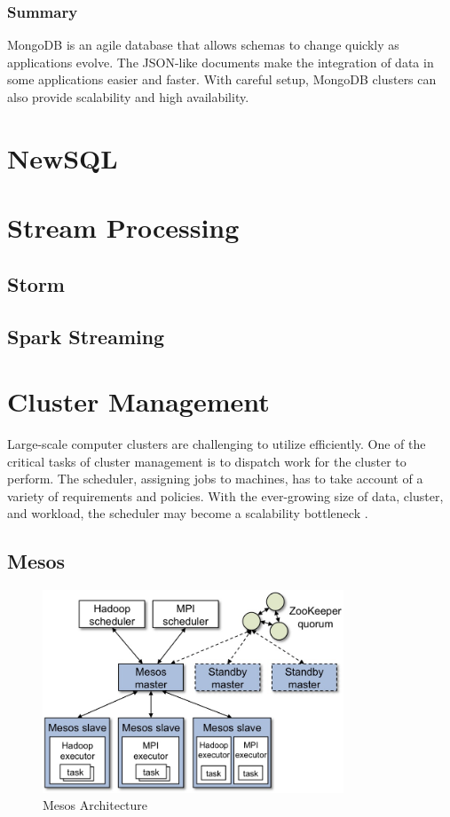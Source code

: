 \documentclass[11pt]{book}
\begin{document}
\subsection{Summary}
MongoDB is an agile database that allows schemas to change quickly as applications evolve. The JSON-like documents make the integration of data in some applications easier and faster. With careful setup, MongoDB clusters can also provide scalability and high availability.

\chapter[NewSQL]
{NewSQL}

\chapter[Stream Processing]
{Stream Processing}

\section{Storm}

\section{Spark Streaming}


\chapter{Cluster Management}
Large-scale computer clusters are challenging to utilize efficiently. One of the critical tasks of cluster management is to dispatch work for the cluster to perform. The scheduler, assigning jobs to machines, has to take account of a variety of requirements and policies. With the ever-growing size of data, cluster, and workload, the scheduler may become a scalability bottleneck \cite{Schwarzkopf:2013:OFS}.

\section[Mesos]
{Mesos}
\begin{figure}[t]
\includegraphics[width=0.8\textwidth]{images/mesos-architecture.jpg}
\centering
\caption{Mesos Architecture}
\end{figure}
\end{document}
